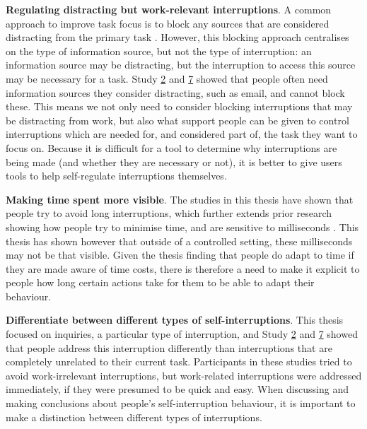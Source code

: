 \textbf{Regulating distracting but work-relevant interruptions}. A common approach to improve task focus is to block any sources that are considered distracting from the primary task \citep{Kim2017, Mark2018}. However, this blocking approach centralises on the type of information source, but not the type of interruption: an information source may be distracting, but the interruption to access this source may be necessary for a task. Study \hyperref[st:Study2]{2} and \hyperref[st:Study7]{7} showed that people often need information sources they consider distracting, such as email, and cannot block these. This means we not only need to consider blocking interruptions that may be distracting from work, but also what support people can be given to control interruptions which are needed for, and considered part of, the task they want to focus on. Because it is difficult for a tool to determine why interruptions are being made (and whether they are necessary or not), it is better to give users tools to help self-regulate interruptions themselves. 


\textbf{Making time spent more visible}. The studies in this thesis have shown that people try to avoid long interruptions, which further extends prior research showing how people try to minimise time, and are sensitive to milliseconds \citep{Charman2003, Gray2004}. This thesis has shown however that outside of a controlled setting, these milliseconds may not be that visible. Given the thesis finding that people do adapt to time if they are made aware of time costs, there is therefore a need to make it explicit to people how long certain actions take for them to be able to adapt their behaviour.

\textbf{Differentiate between different types of self-interruptions}. This thesis focused on inquiries, a particular type of interruption, and Study \hyperref[st:Study2]{2} and \hyperref[st:Study7]{7} showed that people address this interruption differently than interruptions that are completely unrelated to their current task. Participants in these studies tried to avoid work-irrelevant interruptions, but work-related interruptions were addressed immediately, if they were presumed to be quick and easy. When discussing and making conclusions about people's self-interruption behaviour, it is important to make a distinction between different types of interruptions.

